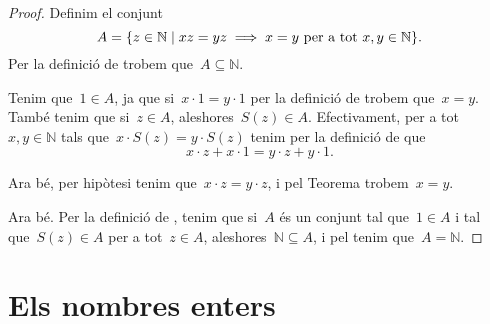 \documentclass[../../main.tex]{subfiles}
\begin{document}
    \begin{proof}
        Definim el conjunt
        \[
            A=\{z\in\mathbb{N}\mid xz=yz\implies x=y\text{ per a tot }x,y\in\mathbb{N}\}.
        \]
        Per la definició de  trobem que~\(A\subseteq\mathbb{N}\).

        Tenim que~\(1\in A\), ja que si~\(x\cdot1=y\cdot1\) per la definició de  trobem que~\(x=y\).
        També tenim que si~\(z\in A\), aleshores~\(S(z)\in A\).
        Efectivament, per a tot~\(x,y\in\mathbb{N}\) tals que~\(x\cdot S(z)=y\cdot S(z)\) tenim per la definició de  que
        \[
            x\cdot z+x\cdot1=y\cdot z+y\cdot1.
        \]

        Ara bé, per hipòtesi tenim que~\(x\cdot z=y\cdot z\), i pel Teorema  trobem~\(x=y\).

        Ara bé.
        Per la definició de , tenim que si~\(A\) és un conjunt tal que~\(1\in A\) i tal que~\(S(z)\in A\) per a tot~\(z\in A\), aleshores~\(\mathbb{N}\subseteq A\), i pel  tenim que~\(A=\mathbb{N}\).
    \end{proof}
\section{Els nombres enters}
\end{document}
